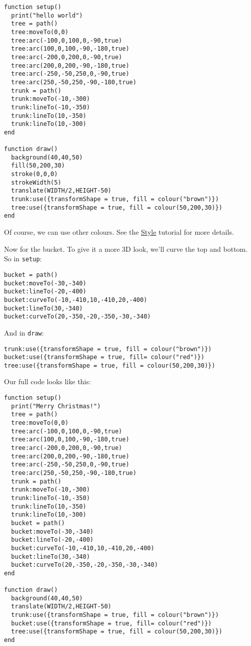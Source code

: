 \documentclass[
  xhtml,%
  use filename%
]{internet}
\begin{document}
\begin{verbatim}
function setup()
  print("hello world")
  tree = path()
  tree:moveTo(0,0)
  tree:arc(-100,0,100,0,-90,true)
  tree:arc(100,0,100,-90,-180,true)
  tree:arc(-200,0,200,0,-90,true)
  tree:arc(200,0,200,-90,-180,true)
  tree:arc(-250,-50,250,0,-90,true)
  tree:arc(250,-50,250,-90,-180,true)
  trunk = path()
  trunk:moveTo(-10,-300)
  trunk:lineTo(-10,-350)
  trunk:lineTo(10,-350)
  trunk:lineTo(10,-300)
end

function draw()
  background(40,40,50)
  fill(50,200,30)
  stroke(0,0,0)
  strokeWidth(5)
  translate(WIDTH/2,HEIGHT-50)
  trunk:use({transformShape = true, fill = colour("brown")})
  tree:use({transformShape = true, fill = colour(50,200,30)})
end
\end{verbatim}

Of course, we can use other colours.
See the \href{Style.xhtml}{Style} tutorial for more details.

Now for the bucket.
To give it a more 3D look, we'll curve the top and bottom.
So in \verb+setup+:

\begin{verbatim}
bucket = path()
bucket:moveTo(-30,-340)
bucket:lineTo(-20,-400)
bucket:curveTo(-10,-410,10,-410,20,-400)
bucket:lineTo(30,-340)
bucket:curveTo(20,-350,-20,-350,-30,-340)
\end{verbatim}

And in \verb+draw+:

\begin{verbatim}
trunk:use({transformShape = true, fill = colour("brown")})
bucket:use({transformShape = true, fill= colour("red")})
tree:use({transformShape = true, fill = colour(50,200,30)})
\end{verbatim}

Our full code looks like this:

\begin{verbatim}
function setup()
  print("Merry Christmas!")
  tree = path()
  tree:moveTo(0,0)
  tree:arc(-100,0,100,0,-90,true)
  tree:arc(100,0,100,-90,-180,true)
  tree:arc(-200,0,200,0,-90,true)
  tree:arc(200,0,200,-90,-180,true)
  tree:arc(-250,-50,250,0,-90,true)
  tree:arc(250,-50,250,-90,-180,true)
  trunk = path()
  trunk:moveTo(-10,-300)
  trunk:lineTo(-10,-350)
  trunk:lineTo(10,-350)
  trunk:lineTo(10,-300)
  bucket = path()
  bucket:moveTo(-30,-340)
  bucket:lineTo(-20,-400)
  bucket:curveTo(-10,-410,10,-410,20,-400)
  bucket:lineTo(30,-340)
  bucket:curveTo(20,-350,-20,-350,-30,-340)
end

function draw()
  background(40,40,50)
  translate(WIDTH/2,HEIGHT-50)
  trunk:use({transformShape = true, fill = colour("brown")})
  bucket:use({transformShape = true, fill= colour("red")})
  tree:use({transformShape = true, fill = colour(50,200,30)})
end
\end{verbatim}
\end{document}
